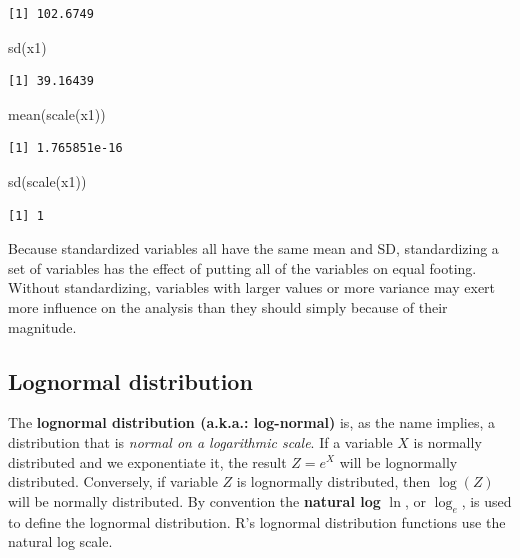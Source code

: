 \documentclass[
  13,
  letterpaper,
]{report}
\newenvironment{Shaded}{\begin{snugshade}}{\end{snugshade}}
\newcommand{\FunctionTok}[1]{\textcolor[rgb]{0.28,0.35,0.67}{#1}}
\newcommand{\NormalTok}[1]{\textcolor[rgb]{0.00,0.23,0.31}{#1}}
\begin{document}
\begin{verbatim}
[1] 102.6749
\end{verbatim}

\begin{Shaded}
\begin{Highlighting}[]
\FunctionTok{sd}\NormalTok{(x1)}
\end{Highlighting}
\end{Shaded}

\begin{verbatim}
[1] 39.16439
\end{verbatim}

\begin{Shaded}
\begin{Highlighting}[]
\FunctionTok{mean}\NormalTok{(}\FunctionTok{scale}\NormalTok{(x1))}
\end{Highlighting}
\end{Shaded}

\begin{verbatim}
[1] 1.765851e-16
\end{verbatim}

\begin{Shaded}
\begin{Highlighting}[]
\FunctionTok{sd}\NormalTok{(}\FunctionTok{scale}\NormalTok{(x1))}
\end{Highlighting}
\end{Shaded}

\begin{verbatim}
[1] 1
\end{verbatim}

Because standardized variables all have the same mean and SD,
standardizing a set of variables has the effect of putting all of the
variables on equal footing. Without standardizing, variables with larger
values or more variance may exert more influence on the analysis than
they should simply because of their magnitude.

\subsection{Lognormal distribution}\label{sec-dist-lnorm}

The \textbf{lognormal distribution (a.k.a.: log-normal)} is, as the name
implies, a distribution that is \emph{normal on a logarithmic scale}. If
a variable \(X\) is normally distributed and we exponentiate it, the
result \(Z=e^X\) will be lognormally distributed. Conversely, if
variable \(Z\) is lognormally distributed, then \(\log\left(Z\right)\)
will be normally distributed. By convention the \textbf{natural log}
\(\ln\), or \(\log_e\), is used to define the lognormal distribution.
R's lognormal distribution functions use the natural log scale.
\end{document}
